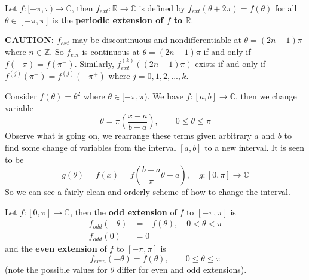 \begin{defn}
Let $f:[-\pi,\pi)\to\mathbb{C}$, then
  $f_{ext}:\mathbb{R}\to\mathbb{C}$ is defined by
  $f_{ext}(\theta+2\pi)=f(\theta)$ for all
  $\theta\in[-\pi,\pi]$ is the \textbf{periodic extension of
    $f$ to $\mathbb{R}$}.
\end{defn}

\textbf{CAUTION:} $f_{ext}$ may be discontinuous and
nondifferentiable at $\theta=(2n-1)\pi$ where
$n\in\mathbb{Z}$. So $f_{ext}$ is continuous at
$\theta=(2n-1)\pi$ if and only if
$f(-\pi)=f(\pi^{-})$. Similarly, $f_{ext}^{(k)}((2n-1)\pi)$
exists if and only if $f^{(j)}(\pi^{-})=f^{(j)}(-\pi^{+})$
where $j=0,1,2,...,k$.

\begin{ex}
Consider $f(\theta)=\theta^2$ where
$\theta\in[-\pi,\pi)$. We have $f:[a,b]\to\mathbb{C}$, then
  we change variable
\begin{equation}
\theta = \pi\left(\frac{x-a}{b-a}\right),\qquad
0\leq\theta\leq\pi
\end{equation}
Observe what is going on, we rearrange these terms given
arbitrary $a$ and $b$ to find some change of variables from
the interval $[a,b]$ to a new interval. It is seen to be
\begin{equation}
g(\theta) = f(x) = f\left(\frac{b-a}{\pi}\theta +
a\right),\quad g:[0,\pi]\to\mathbb{C}
\end{equation}
So we can see a fairly clean and orderly scheme of how to
change the interval.
\end{ex}

\begin{defn}
Let $f:[0,\pi]\to\mathbb{C}$, then the \textbf{odd
  extension} of $f$ to $[-\pi,\pi]$ is
\begin{subequations}
\begin{align}
f_{odd}(-\theta) &= -f(\theta), \quad 0<\theta<\pi\\
f_{odd}(0) &= 0
\end{align}
\end{subequations}
and the \textbf{even extension} of $f$ to $[-\pi,\pi]$ is 
\begin{equation}
f_{even}(-\theta) = f(\theta),\qquad 0\leq\theta\leq\pi
\end{equation}
(note the possible values for $\theta$ differ for even and
odd extensions).
\end{defn}

